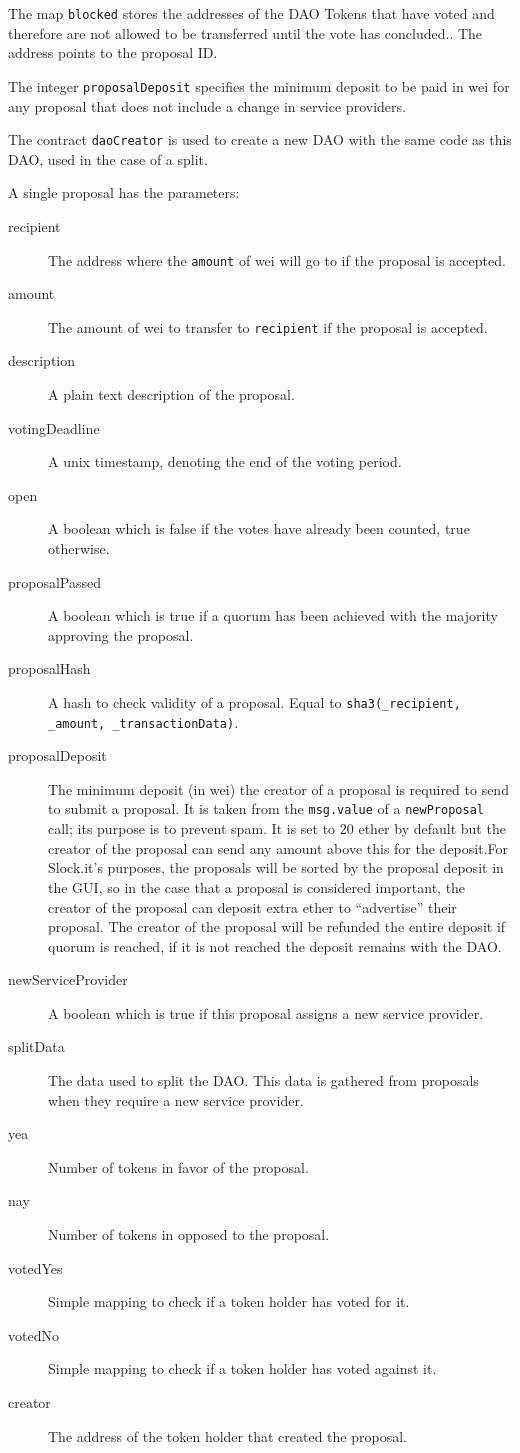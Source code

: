 \documentclass[9pt,oneside]{amsart}
\begin{document}
\begin{multicols}{2}
The map \verb|blocked| stores the addresses of the DAO Tokens that have voted and therefore are not allowed to be transferred until the vote has concluded.. The address points to the proposal ID.

The integer \verb|proposalDeposit| specifies the minimum deposit to be paid in wei for any proposal that does not include a change in service providers.

The contract \verb|daoCreator| is used to create a new DAO with the same code as this DAO, used in the case of a split.

A single proposal has the parameters:
\begin{description}
 \item[recipient] The address where the \verb|amount| of wei will go to if the proposal is accepted.
 \item[amount] The amount of wei to transfer to \verb|recipient| if the proposal is accepted.
 \item[description] A plain text description of the proposal.
 \item[votingDeadline] A unix timestamp, denoting the end of the voting period.
 \item[open] A boolean which is false if the votes have already been counted, true otherwise.
 \item[proposalPassed] A boolean which is true if a quorum has been achieved with the majority approving the proposal.
 \item[proposalHash] A hash to check validity of a proposal. Equal to \verb|sha3(_recipient, _amount, _transactionData)|.
 \item[proposalDeposit] The minimum deposit (in wei) the creator of a proposal is required to send to submit a proposal. It is taken from the \verb|msg.value| of a \verb|newProposal| call; its purpose is to prevent spam. It is set to $20$ ether by default but the creator of the proposal can send any amount above this for the deposit.For Slock.it’s purposes, the proposals will be sorted by the proposal deposit in the GUI, so in the case that a proposal is considered important, the creator of the proposal can deposit extra ether to “advertise” their proposal. The creator of the proposal will be refunded the entire deposit if quorum is reached, if it is not reached the deposit remains with the DAO. 
 \item[newServiceProvider] A boolean which is true if this proposal assigns a new service provider.
 \item[splitData] The data used to split the DAO. This data is gathered from proposals when they require a new service provider.
 \item[yea] Number of tokens in favor of the proposal.
 \item[nay] Number of tokens in opposed to the proposal.
 \item[votedYes] Simple mapping to check if a token holder has voted for it.
 \item[votedNo] Simple mapping to check if a token holder has voted against it.
 \item[creator] The address of the token holder that created the proposal.
\end{description}


\end{multicols}
\end{document}
